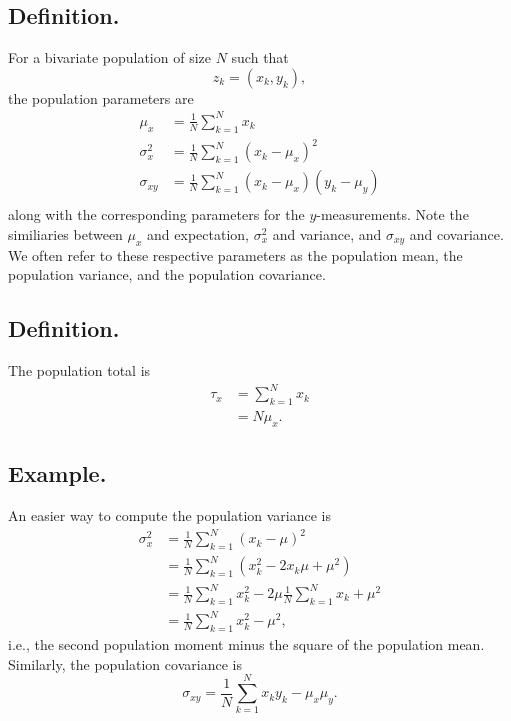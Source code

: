 \documentclass[titlepage]{article}
\begin{document}
\subsection{Definition.} For a bivariate population of size $N$ such that 
$$z_{k} = (x_{k}, y_{k}),$$
the population parameters are 
\begin{align*}
           \mu_{x} &= \frac{1}{N}\sum_{k=1}^{N}x_{k} \\
    \sigma_{x}^{2} &= \frac{1}{N}\sum_{k=1}^{N}(x_{k} - \mu_{x})^{2} \\
       \sigma_{xy} &= \frac{1}{N}\sum_{k=1}^{N}(x_{k} - \mu_{x})(y_{k} - \mu_{y}) \\
\end{align*}
along with the corresponding parameters for the $y$-measurements. Note the similiaries between $\mu_{x}$ and expectation, $\sigma_{x}^{2}$ and variance, and $\sigma_{xy}$ and covariance. We often refer to these respective parameters as the population mean, the population variance, and the population covariance.

\subsection{Definition.} The population total is 
\begin{align*}
    \tau_{x} &= \sum_{k=1}^{N}x_{k} \\
             &= N\mu_{x}.
\end{align*}

\subsection{Example.} An easier way to compute the population variance is
\begin{align*}
    \sigma_{x}^{2} &= \frac{1}{N}\sum_{k=1}^{N}(x_{k} - \mu)^{2} \\
                   &= \frac{1}{N}\sum_{k=1}^{N}\left(x_{k}^{2} - 2x_{k}\mu + \mu^{2}\right) \\
                   &= \frac{1}{N}\sum_{k=1}^{N}x_{k}^{2} - 2\mu\frac{1}{N}\sum_{k=1}^{N}x_{k} + \mu^{2} \\
                   &= \frac{1}{N}\sum_{k=1}^{N}x_{k}^{2} -\mu^{2},
\end{align*}
i.e., the second population moment minus the square of the population mean. Similarly, the population covariance is 
$$\sigma_{xy} = \frac{1}{N}\sum_{k=1}^{N}x_{k}y_{k} - \mu_{x}\mu_{y}.$$
\end{document}

